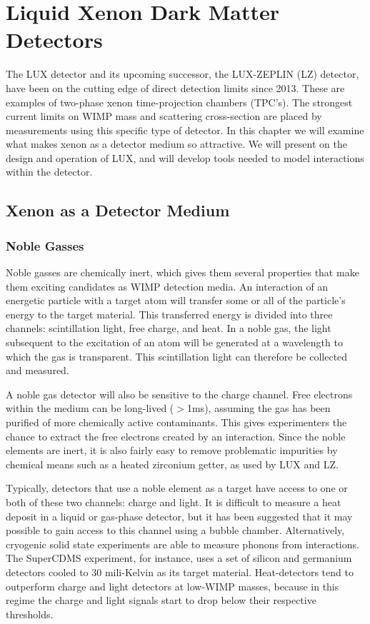 \chapter{Liquid Xenon Dark Matter Detectors}\label{chap:2}
The LUX detector and its upcoming successor, the LUX-ZEPLIN (LZ) detector, have been on the cutting edge of direct detection limits since 2013. These are examples of two-phase xenon time-projection chambers (TPC's). The strongest current limits on WIMP mass and scattering cross-section are placed by measurements using this specific type of detector. In this chapter we will examine what makes xenon as a detector medium so attractive. We will present on the design and operation of LUX, and will develop tools needed to model interactions within the detector.

\section{Xenon as a Detector Medium}
\subsection{Noble Gasses}
Noble gasses are chemically inert, which gives them several properties that make them exciting candidates as WIMP detection media. An interaction of an energetic particle with a target atom will transfer some or all of the particle's energy to the target material. This transferred energy is divided into three channels: scintillation light, free charge, and heat. In a noble gas, the light subsequent to the excitation of an atom will be generated at a wavelength to which the gas is transparent. This scintillation light can therefore be collected and measured.

A noble gas detector will also be sensitive to the charge channel. Free electrons within the medium can be long-lived ($>$1ms), assuming the gas has been purified of more chemically active contaminants. This gives experimenters the chance to extract the free electrons created by an interaction. Since the noble elements are inert, it is also fairly easy to remove problematic impurities by chemical means such as a heated zirconium getter, as used by LUX and LZ.

Typically, detectors that use a noble element as a target have access to one or both of these two channels: charge and light. It is difficult to measure a heat deposit in a liquid or gas-phase detector, but it has been suggested that it may possible to gain access to this channel using a bubble chamber\cite{bubble}. Alternatively, cryogenic solid state experiments are able to measure phonons from interactions. The SuperCDMS experiment, for instance, uses a set of silicon and germanium detectors cooled to 30 mili-Kelvin as its target material\cite{cdms}. Heat-detectors tend to outperform charge and light detectors at low-WIMP masses, because in this regime the charge and light signals start to drop below their respective thresholds.

